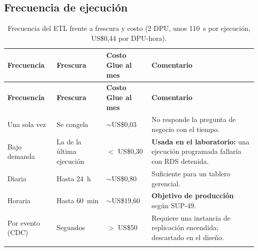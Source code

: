 \subsection{Frecuencia de ejecución}
\begin{longtable}{@{}L{3.0cm} L{3.4cm} L{3.0cm} L{6.2cm}@{}}
\toprule \textbf{Frecuencia} & \textbf{Frescura} & \textbf{Costo Glue al mes} & \textbf{Comentario} \\ \midrule \endfirsthead
\toprule \textbf{Frecuencia} & \textbf{Frescura} & \textbf{Costo Glue al mes} & \textbf{Comentario} \\ \midrule \endhead
Una sola vez & Se congela & $\sim$US\$0,03 & No responde la pregunta de negocio con el tiempo. \\
Bajo demanda & La de la última ejecución & $<$ US\$0,30 & \textbf{Usada en el laboratorio:} una ejecución programada fallaría con RDS detenida. \\
Diaria & Hasta 24~h & $\sim$US\$0,80 & Suficiente para un tablero gerencial. \\
Horaria & Hasta 60~min & $\sim$US\$19,60 & \textbf{Objetivo de producción} según SUP-49. \\
Por evento (CDC) & Segundos & $>$ US\$50 & Requiere una instancia de replicación encendida; descartado en el diseño. \\
\bottomrule
\caption{Frecuencia del ETL frente a frescura y costo (2 DPU, unos 110~s por ejecución, US\$0,44 por DPU-hora).}
\end{longtable}


